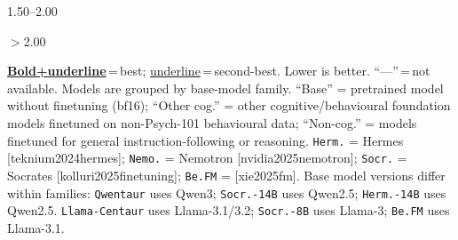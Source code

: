 \documentclass{article}
\providecommand{\citet}[1]{[#1]}
\providecommand{\citep}[1]{[#1]}
\newlength{\ctrtblwd}
\begin{document}
\begin{table}
\begin{minipage}{\ctrtblwd}
\begin{center}
\colorbox{c8!40}{\strut\hspace{5pt}} \scriptsize 1.50--2.00 \quad
\colorbox{c9!35}{\strut\hspace{5pt}} \scriptsize$>$2.00
\end{center}
\vspace{-2pt}
{\tiny \underline{\textbf{Bold+underline}}\,=\,best; \underline{underline}\,=\,second-best. Lower is better. ``---''\,=\,not available. Models are grouped by base-model family. ``Base'' = pretrained model without finetuning (bf16); ``Other cog.'' = other cognitive/behavioural foundation models finetuned on non-Psych-101 behavioural data; ``Non-cog.'' = models finetuned for general instruction-following or reasoning. \texttt{Herm.} = Hermes \citep{teknium2024hermes}; \texttt{Nemo.} = Nemotron \citep{nvidia2025nemotron}; \texttt{Socr.} = Socrates \citep{kolluri2025finetuning}; \texttt{Be.FM} = \citet{xie2025fm}. Base model versions differ within families: \texttt{Qwentaur} uses Qwen3; \texttt{Socr.-14B} uses Qwen2.5; \texttt{Herm.-14B} uses Qwen2.5. \texttt{Llama-Centaur} uses Llama-3.1/3.2; \texttt{Socr.-8B} uses Llama-3; \texttt{Be.FM} uses Llama-3.1.}
\end{minipage}
\captionsetup{width=\ctrtblwd}
\caption{Comparison of cognitively finetuned models with other behavioural foundation models and non-cognitive controls on Psych-101, grouped by base-model family. Within each family, \texttt{Qwentaur}/\texttt{Llama-Centaur} (cognitive SFT on Psych-101) consistently outperform both other behavioural FMs and non-cognitive controls, demonstrating that alignment with human behavioural patterns requires cognitive finetuning on structured experimental data, not merely finetuning per se.}
\label{tab:family_comparison}
\end{table}
\end{document}
